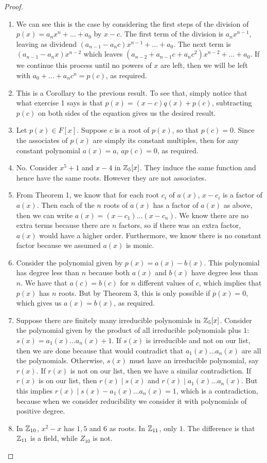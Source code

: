\begin{proof}
 \begin{enumerate}
     \item We can see this is the case by considering the first steps of the division of $p(x)=a_nx^n+\dots+a_0$ by $x-c$. The first term of the division is $a_nx^{n-1}$, leaving as dividend $(a_{n-1}-a_nc)x^{n-1}+\dots+a_0$. The next term is $(a_{n-1}-a_nx)x^{n-2}$ which leaves $(a_{n-2}+a_{n-1}c+a_nc^2)x^{n-2}+\dots+a_0$. If we continue this process until no powers of $x$ are left, then we will be left with $a_0+\dots+a_nc^n=p(c)$, as required. 
     \item This is a Corollary to the previous result. To see that, simply notice that what exercise 1 says is that $p(x)=(x-c)q(x)+p(c)$, subtracting $p(c)$ on both sides of the equation gives us the desired result.
     \item Let $p(x)\in F[x]$. Suppose $c$ is a root of $p(x)$, so that $p(c)=0$. Since the associates of $p(x)$ are simply its constant multiples, then for any constant polynomial $a(x)=a$, $ap(c)=0$, as required.
     \item No. Consider $x^5+1$ and $x-4$ in $\mathbb{Z}_5[x]$. They induce the same function and hence have the same roots. However they are not associates.
     \item From Theorem 1, we know that for each root $c_i$ of $a(x)$, $x-c_i$ is a factor of $a(x)$. Then each of the $n$ roots of $a(x)$ has a factor of $a(x)$ as above, then we can write $a(x)=(x-c_1)\dots(x-c_n)$. We know there are no extra terms because there are $n$ factors, so if there was an extra factor, $a(x)$ would have a higher order. Furthermore, we know there is no constant factor because we assumed $a(x)$ is monic. 
     \item Consider the polynomial given by $p(x)=a(x)-b(x)$. This polynomial has degree less than $n$ because both $a(x)$ and $b(x)$ have degree less than $n$. We have that $a(c)=b(c)$ for $n$ different values of $c$, which implies that $p(x)$ has $n$ roots. But by Theorem 3, this is only possible if $p(x)=0$, which gives us $a(x)=b(x)$, as required.
     \item Suppose there are finitely many irreducible polynomials in $\mathbb{Z}_5[x]$. Consider the polynomial given by the product of all irreducible polynomials plus $1$: $s(x)=a_1(x)\dots a_n(x)+1$. If $s(x)$ is irreducible and not on our list, then we are done because that would contradict that $a_1(x)\dots a_n(x)$ are all the polynomials. Otherwise, $s(x)$ must have an irreducible polynomial, say $r(x)$. If $r(x)$ is not on our list, then we have a similar contradiction. If $r(x)$ is on our list, then $r(x)\mid s(x)$ and $r(x)\mid a_1(x)\dots a_n(x)$. But this implies $r(x)\mid s(x)-a_1(x)\dots a_n(x)= 1$, which is a contradiction, because when we consider reducibility we consider it with polynomials of positive degree.
     \item In $\mathbb{Z}_{10}$, $x^2-x$ has $1,5$ and $6$ as roots. In $\mathbb{Z}_{11}$, only $1$. The difference is that $\mathbb{Z}_{11}$ is a field, while $Z_{10}$ is not.
 \end{enumerate}
\end{proof}

